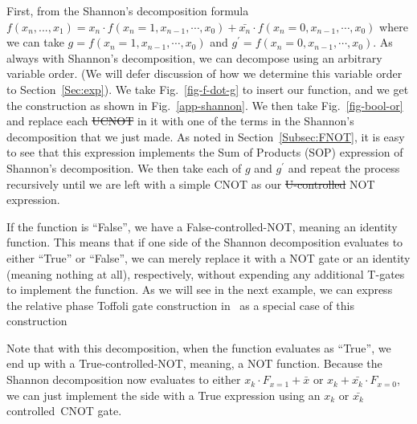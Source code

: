 \documentclass[paper]{ieice}
\providecommand{\DIFadd}[1]{{\protect\color{blue}{#1}}} %
\providecommand{\DIFdel}[1]{{\protect\color{red}\sout{#1}}}                      %
\providecommand{\DIFaddbegin}{} %
\providecommand{\DIFaddend}{} %
\providecommand{\DIFdelbegin}{} %
\providecommand{\DIFdelend}{} %
\newcommand{\DIFscaledelfig}{0.5}
\newlength{\DIFdelgraphicswidth} %
\newlength{\DIFdelgraphicsheight} %
\newcommand{\DIFaddincludegraphics}[2][]{{\color{blue}\fbox{\DIFOincludegraphics[#1]{#2}}}} %
\newcommand{\DIFdelincludegraphics}[2][]{%
\sbox{\DIFdelgraphicsbox}{\DIFOincludegraphics[#1]{#2}}%
\settoboxwidth{\DIFdelgraphicswidth}{\DIFdelgraphicsbox} %
\settoboxtotalheight{\DIFdelgraphicsheight}{\DIFdelgraphicsbox} %
\scalebox{\DIFscaledelfig}{%
\parbox[b]{\DIFdelgraphicswidth}{\usebox{\DIFdelgraphicsbox}\\[-\baselineskip] \rule{\DIFdelgraphicswidth}{0em}}\llap{\resizebox{\DIFdelgraphicswidth}{\DIFdelgraphicsheight}{%
\setlength{\unitlength}{\DIFdelgraphicswidth}%
\begin{picture}(1,1)%
\thicklines\linethickness{2pt} %
{\color[rgb]{1,0,0}\put(0,0){\framebox(1,1){}}}%
{\color[rgb]{1,0,0}\put(0,0){\line( 1,1){1}}}%
{\color[rgb]{1,0,0}\put(0,1){\line(1,-1){1}}}%
\end{picture}%
}\hspace*{3pt}}} %
} %
\DeclareRobustCommand{\DIFaddbegin}{\DIFOaddbegin \let\includegraphics\DIFaddincludegraphics} %
\DeclareRobustCommand{\DIFaddend}{\DIFOaddend \let\includegraphics\DIFOincludegraphics} %
\DeclareRobustCommand{\DIFdelbegin}{\DIFOdelbegin \let\includegraphics\DIFdelincludegraphics} %
\DeclareRobustCommand{\DIFdelend}{\DIFOaddend \let\includegraphics\DIFOincludegraphics} %
\begin{document}
First, from the Shannon's decomposition
formula~$f(x_n,...,x_1) = x_n \cdot f(x_n=1,x_{n-1},\cdots,x_0) + \bar{x_n} \cdot f(x_n=0,x_{n-1},\cdots,x_0)$
where we can take $g=f(x_n=1,x_{n-1},\cdots,x_0)$ and $g^{\prime}=f(x_n=0,x_{n-1},\cdots,x_0)$. As always with
Shannon's decomposition, we can decompose using an arbitrary variable order. (We will defer discussion of how we
determine this variable order to Section~\ref{Sec:exp}). We take Fig.~\ref{fig-f-dot-g} to insert our function, and
we get the construction as shown in Fig.~\ref{app-shannon}. We then take Fig.~\ref{fig-bool-or} and replace each
\DIFdelbegin \DIFdel{UCNOT }\DIFdelend \DIFaddbegin \DIFadd{FCNOT }\DIFaddend in it with one of the terms in the Shannon's decomposition that we just made. As noted in Section~\ref{Subsec:FNOT}, it is easy to see that this expression implements the Sum of Products (SOP) expression
of Shannon's decomposition. We then take each of $g$ and $g^{\prime}$ and repeat the process recursively until we
are left with a simple CNOT as our \DIFdelbegin \DIFdel{U-controlled }\DIFdelend \DIFaddbegin \DIFadd{F-controlled }\DIFaddend NOT expression.

If the function is ``False'', we have a False-controlled-NOT, meaning an identity function. This means that if one side of
the Shannon decomposition evaluates to either ``True'' or ``False'', we can merely replace it with a NOT gate or an
identity (meaning nothing at all), respectively, without expending any additional T-gates to implement the
function. As we will see in the next example, we can express the relative phase Toffoli gate construction
in~\cite{bib-amy-phase-state} as a special case of this construction\DIFaddbegin \DIFadd{.
}\DIFaddend 

Note that with this decomposition, when the function evaluates as ``True'', we end up with a True-controlled-NOT,
meaning, a NOT function. Because the Shannon decomposition now evaluates to either $x_k \cdot F_{x=1} + \bar{x}$ or
$x_k + \bar{x_k} \cdot F_{x=0}$, we can just implement the side with a True expression using an $x_k$ or
$\bar{x_k}$ controlled~CNOT gate. 
\end{document}
